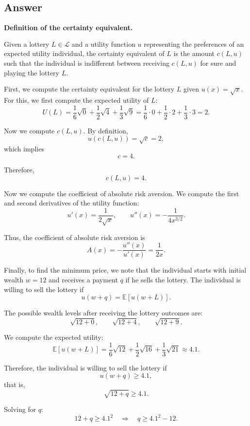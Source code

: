 \documentclass[12pt]{article}
\begin{document}
\subsection*{Answer}
\textbf{Definition of the certainty equivalent.}

Given a lottery $L \in \mathcal{L}$ and a utility function $u$ representing the preferences of an expected utility individual, the certainty equivalent of $L$ is the amount $c(L,u)$ such that the individual is indifferent between receiving $c(L,u)$ for sure and playing the lottery $L$.

\medskip

First, we compute the certainty equivalent for the lottery $L$ given $u(x)=\sqrt{x}$.  
For this, we first compute the expected utility of $L$:
\[
U(L) = \frac{1}{6}\sqrt{0} + \frac{1}{2}\sqrt{4} + \frac{1}{3}\sqrt{9}
= \frac{1}{6}\cdot 0 + \frac{1}{2}\cdot 2 + \frac{1}{3}\cdot 3
= 2.
\]

Now we compute $c(L,u)$. By definition,
\[
u(c(L,u)) = \sqrt{c} = 2,
\]
which implies
\[
c = 4.
\]

Therefore,
\[
c(L,u) = 4.
\]

\medskip

Now we compute the coefficient of absolute risk aversion. We compute the first and second derivatives of the utility function:
\[
u'(x) = \frac{1}{2\sqrt{x}}, 
\qquad
u''(x) = -\frac{1}{4x^{3/2}}.
\]

Thus, the coefficient of absolute risk aversion is
\[
A(x) = -\frac{u''(x)}{u'(x)} = \frac{1}{2x}.
\]

\medskip

Finally, to find the minimum price, we note that the individual starts with initial wealth $w=12$ and receives a payment $q$ if he sells the lottery. The individual is willing to sell the lottery if
\[
u(w+q) = \mathbb{E}[u(w+L)].
\]

The possible wealth levels after receiving the lottery outcomes are:
\[
\sqrt{12+0}, \qquad \sqrt{12+4}, \qquad \sqrt{12+9}.
\]

We compute the expected utility:
\[
\mathbb{E}[u(w+L)]
= \frac{1}{6}\sqrt{12} + \frac{1}{2}\sqrt{16} + \frac{1}{3}\sqrt{21}
\approx 4.1.
\]

Therefore, the individual is willing to sell the lottery if
\[
u(w+q) \geq 4.1,
\]
that is,
\[
\sqrt{12+q} \geq 4.1.
\]

Solving for $q$:
\[
12+q \geq 4.1^2
\quad\Longrightarrow\quad
q \geq 4.1^2 - 12.
\]
\end{document}
